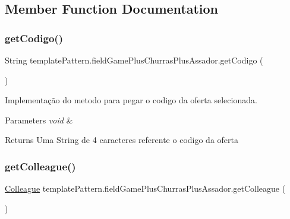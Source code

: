 \subsection{Member Function Documentation}
\mbox{\label{classtemplate_pattern_1_1field_game_plus_churras_plus_assador_ad6a116035e3027136604848ba89fa251}} 
\subsubsection{\texorpdfstring{getCodigo()}{getCodigo()}}
{\footnotesize\ttfamily String template\+Pattern.\+field\+Game\+Plus\+Churras\+Plus\+Assador.\+get\+Codigo (\begin{DoxyParamCaption}{ }\end{DoxyParamCaption})}



Implementação do metodo para pegar o codigo da oferta selecionada. 


\begin{DoxyParams}{Parameters}
{\em void} & \\
\hline
\end{DoxyParams}
\begin{DoxyReturn}{Returns}
Uma String de 4 caracteres referente o codigo da oferta 
\end{DoxyReturn}
\mbox{\label{classtemplate_pattern_1_1field_game_plus_churras_plus_assador_a50186e4f8a95f366099cb0f01ab58e48}} 
\subsubsection{\texorpdfstring{getColleague()}{getColleague()}}
{\footnotesize\ttfamily \mbox{\hyperlink{classmediator_pattern_1_1_colleague}{Colleague}} template\+Pattern.\+field\+Game\+Plus\+Churras\+Plus\+Assador.\+get\+Colleague (\begin{DoxyParamCaption}{ }\end{DoxyParamCaption})}



